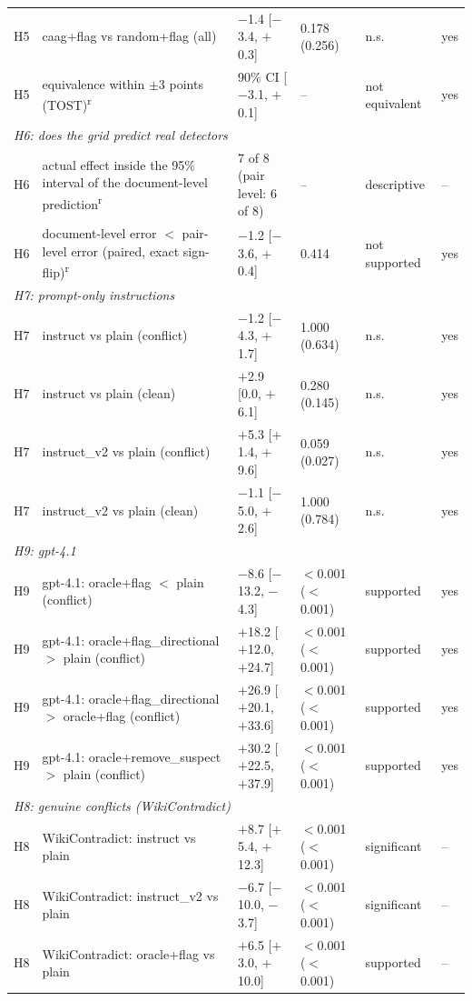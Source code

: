 \begin{table}[p]
{\begin{tabular}{lp{6.6cm}llll}
H5 & caag+flag vs random+flag (all) & $-$1.4 [$-$3.4, $+$0.3] & 0.178 (0.256) & n.s. & yes \\
H5 & equivalence within $\pm$3 points (TOST)\textsuperscript{r} & 90\% CI [$-$3.1, $+$0.1] & -- & not equivalent & yes \\
\multicolumn{6}{l}{\emph{H6: does the grid predict real detectors}} \\
H6 & actual effect inside the 95\% interval of the document-level prediction\textsuperscript{r} & 7 of 8 (pair level: 6 of 8) & -- & descriptive & -- \\
H6 & document-level error $<$ pair-level error (paired, exact sign-flip)\textsuperscript{r} & $-$1.2 [$-$3.6, $+$0.4] & 0.414 & not supported & yes \\
\multicolumn{6}{l}{\emph{H7: prompt-only instructions}} \\
H7 & instruct vs plain (conflict) & $-$1.2 [$-$4.3, $+$1.7] & 1.000 (0.634) & n.s. & yes \\
H7 & instruct vs plain (clean) & $+$2.9 [0.0, $+$6.1] & 0.280 (0.145) & n.s. & yes \\
H7 & instruct\_v2 vs plain (conflict) & $+$5.3 [$+$1.4, $+$9.6] & 0.059 (0.027) & n.s. & yes \\
H7 & instruct\_v2 vs plain (clean) & $-$1.1 [$-$5.0, $+$2.6] & 1.000 (0.784) & n.s. & yes \\
\multicolumn{6}{l}{\emph{H9: gpt-4.1}} \\
H9 & gpt-4.1: oracle+flag $<$ plain (conflict) & $-$8.6 [$-$13.2, $-$4.3] & $<$0.001 ($<$0.001) & supported & yes \\
H9 & gpt-4.1: oracle+flag\_directional $>$ plain (conflict) & $+$18.2 [$+$12.0, $+$24.7] & $<$0.001 ($<$0.001) & supported & yes \\
H9 & gpt-4.1: oracle+flag\_directional $>$ oracle+flag (conflict) & $+$26.9 [$+$20.1, $+$33.6] & $<$0.001 ($<$0.001) & supported & yes \\
H9 & gpt-4.1: oracle+remove\_suspect $>$ plain (conflict) & $+$30.2 [$+$22.5, $+$37.9] & $<$0.001 ($<$0.001) & supported & yes \\
\multicolumn{6}{l}{\emph{H8: genuine conflicts (WikiContradict)}} \\
H8 & WikiContradict: instruct vs plain & $+$8.7 [$+$5.4, $+$12.3] & $<$0.001 ($<$0.001) & significant & -- \\
H8 & WikiContradict: instruct\_v2 vs plain & $-$6.7 [$-$10.0, $-$3.7] & $<$0.001 ($<$0.001) & significant & -- \\
H8 & WikiContradict: oracle+flag vs plain & $+$6.5 [$+$3.0, $+$10.0] & $<$0.001 ($<$0.001) & supported & -- \\

\end{tabular}}
\end{table}
